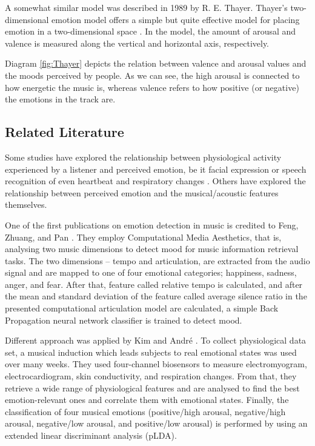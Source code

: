 A somewhat similar model was described in 1989 by R. E. Thayer. Thayer’s two-dimensional emotion model offers a simple but quite effective model for placing emotion in a two-dimensional space \cite{Thayer}. In the model, the amount of arousal and valence is measured along the vertical and horizontal axis, respectively.

Diagram \ref{fig:Thayer} depicts the relation between valence and arousal values and the moods perceived by people. As we can see, the high arousal is connected to how energetic the music is, whereas valence refers to how positive (or negative) the emotions in the track are. 

\vspace{10pt}

\subsection{Related Literature}

Some studies have explored the relationship between physiological activity experienced by a listener and perceived emotion, be it facial expression or speech recognition of even heartbeat and respiratory changes \cite{physicalmood}.
Others have explored the relationship between perceived emotion and the musical/acoustic features themselves.

One of the first publications on emotion detection in music is credited to Feng, Zhuang, and Pan \cite{moodold}. They employ Computational Media Aesthetics, that is, analysing two music dimensions to detect mood for music information retrieval tasks. The two dimensions -- tempo and articulation, are extracted from the audio signal and are mapped to one of four emotional categories; happiness, sadness, anger, and fear. 
After that, feature called relative tempo is calculated, and after the mean and standard deviation of the feature called average silence ratio in the presented computational articulation model are calculated, a simple Back Propagation neural network classifier is trained to detect mood.

Different approach was applied by Kim and Andr\'{e} \cite{physicalmood}. To collect physiological data set, a musical induction which leads subjects to real emotional states was used over many weeks. They used four-channel biosensors to measure electromyogram, electrocardiogram, skin conductivity, and respiration changes. From that, they retrieve a wide range of physiological features and are analysed to find the best emotion-relevant ones and correlate them with emotional states. Finally, the classification of four musical emotions (positive/high arousal, negative/high arousal, negative/low arousal, and positive/low arousal) is performed by using an extended linear discriminant analysis (pLDA).

